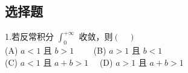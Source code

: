 
\subsection{选择题}
1.若反常积分 $\int_{0}^{+\infty}$ 收敛，则$(\quad)$\\
(A) $a<1$ 且 $b>1 \qquad$
(B) $a>1$ 且 $b<1$\\
(C) $a<1$ 且 $a+b>1 \quad$
(D) $a>1$ 且 $a+b>1$

